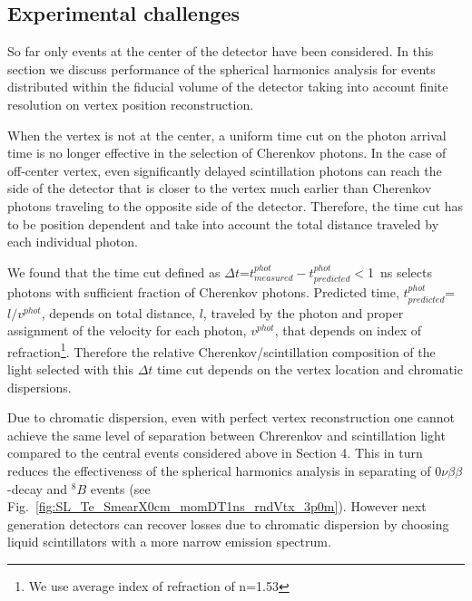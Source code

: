 \documentclass[12pt,twoside,letterpaper]{article}
\newcommand{\vbb}{0\nu\beta\beta}
\newcommand{\B}{^{8}B}
\begin{document}
\subsection{Experimental challenges}

So far only events at the center of the detector have been considered. In this section we discuss performance of the spherical harmonics analysis for events distributed within the fiducial volume of the detector taking into account finite resolution on vertex position reconstruction.

When the vertex is not at the center, a uniform time cut on the photon arrival time is no longer effective in the selection of Cherenkov photons. In the case of off-center vertex, even significantly delayed scintillation photons can reach the side of the detector that is closer to the vertex much earlier than Cherenkov photons traveling to the opposite side of the detector. Therefore, the time cut has to be position dependent and take into account the total distance traveled by each individual photon.

We found that the time cut defined as $\Delta t$=$t^{phot}_{measured} - t^{phot}_{predicted}$$<$1~ns selects photons with sufficient fraction of Cherenkov photons. Predicted time, $ t^{phot}_{predicted}$=$l/v^{phot}$, depends on total distance, $l$, traveled by the photon and proper assignment of the velocity for each photon, $v^{phot}$, that depends on index of refraction\footnote{We use average index of refraction of n=1.53}. Therefore the relative Cherenkov/scintillation composition of the light selected with this $\Delta t$ time cut depends on the vertex location and chromatic dispersions. 

Due to chromatic dispersion, even with perfect vertex reconstruction one cannot achieve the same level of separation between Chrerenkov and scintillation light compared to the central events considered above in Section 4. This in turn reduces the effectiveness of the spherical harmonics analysis in separating of $\vbb$-decay and $\B$ events (see Fig.~\ref{fig:SL_Te_SmearX0cm_momDT1ns_rndVtx_3p0m}). However next generation detectors can recover losses due to chromatic dispersion by choosing liquid scintillators with a more narrow emission spectrum.
\end{document}
